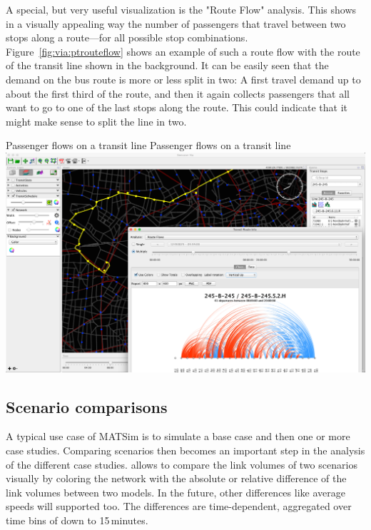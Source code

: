 A special, but very useful visualization is the "Route Flow" analysis. This
shows in a visually appealing way the number of passengers that travel between
two stops along a route---for all possible stop combinations.
Figure~\ref{fig:via:ptrouteflow} shows an example of such a route flow with the
route of the transit line shown in the background.
It can be easily seen that the demand on the bus route is more or less split in two: A
first travel demand up to about the first third of the route, and then it again
collects passengers that all want to go to one of the last stops along the
route. This could indicate that it might make sense to split the line in two.

\createfigure%
{Passenger flows on a transit line}%
{Passenger flows on a transit line}%
{\label{fig:via:ptrouteflow}}%
{\includegraphics[width=1.\textwidth,angle=0]{./extending/figures/via/ptrouteflows}}%
{}

\subsection{Scenario comparisons}
A typical use case of MATSim is to simulate a base case and then one or more
case studies. Comparing scenarios then becomes an important step in the analysis
of the different case studies. \Via{} allows to compare the link volumes of two
scenarios visually by coloring the network with the absolute or relative
difference of the link volumes between two models. In the future, other
differences like average speeds will supported too. The differences are
time-dependent, aggregated over time bins of down to 15\,minutes.


